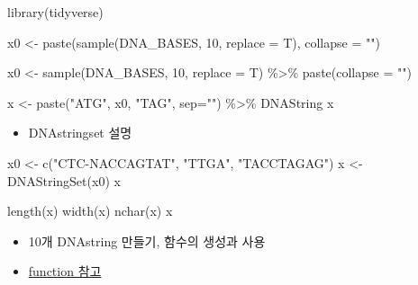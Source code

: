 \documentclass[
]{book}
\newenvironment{Shaded}{\begin{snugshade}}{\end{snugshade}}
\newcommand{\AttributeTok}[1]{\textcolor[rgb]{0.77,0.63,0.00}{#1}}
\newcommand{\DecValTok}[1]{\textcolor[rgb]{0.00,0.00,0.81}{#1}}
\newcommand{\FunctionTok}[1]{\textcolor[rgb]{0.00,0.00,0.00}{#1}}
\newcommand{\NormalTok}[1]{#1}
\newcommand{\OtherTok}[1]{\textcolor[rgb]{0.56,0.35,0.01}{#1}}
\newcommand{\SpecialCharTok}[1]{\textcolor[rgb]{0.00,0.00,0.00}{#1}}
\newcommand{\StringTok}[1]{\textcolor[rgb]{0.31,0.60,0.02}{#1}}
\providecommand{\tightlist}{%
  \setlength{\itemsep}{0pt}\setlength{\parskip}{0pt}}
\begin{document}
\begin{Shaded}
\begin{Highlighting}[]
\FunctionTok{library}\NormalTok{(tidyverse)}

\NormalTok{x0 }\OtherTok{\textless{}{-}} \FunctionTok{paste}\NormalTok{(}\FunctionTok{sample}\NormalTok{(DNA\_BASES, }\DecValTok{10}\NormalTok{, }\AttributeTok{replace =}\NormalTok{ T), }\AttributeTok{collapse =} \StringTok{""}\NormalTok{)}

\NormalTok{x0 }\OtherTok{\textless{}{-}} \FunctionTok{sample}\NormalTok{(DNA\_BASES, }\DecValTok{10}\NormalTok{, }\AttributeTok{replace =}\NormalTok{ T) }\SpecialCharTok{\%\textgreater{}\%}
        \FunctionTok{paste}\NormalTok{(}\AttributeTok{collapse =} \StringTok{""}\NormalTok{)}

\NormalTok{x }\OtherTok{\textless{}{-}} \FunctionTok{paste}\NormalTok{(}\StringTok{"ATG"}\NormalTok{, x0, }\StringTok{"TAG"}\NormalTok{, }\AttributeTok{sep=}\StringTok{""}\NormalTok{) }\SpecialCharTok{\%\textgreater{}\%} 
\NormalTok{      DNAString}
\NormalTok{x}
\end{Highlighting}
\end{Shaded}

\begin{itemize}
\tightlist
\item
  DNAstringset 설명
\end{itemize}

\begin{Shaded}
\begin{Highlighting}[]
\NormalTok{x0 }\OtherTok{\textless{}{-}} \FunctionTok{c}\NormalTok{(}\StringTok{"CTC{-}NACCAGTAT"}\NormalTok{, }\StringTok{"TTGA"}\NormalTok{, }\StringTok{"TACCTAGAG"}\NormalTok{)}
\NormalTok{x }\OtherTok{\textless{}{-}} \FunctionTok{DNAStringSet}\NormalTok{(x0)}
\NormalTok{x}

\FunctionTok{length}\NormalTok{(x)}
\FunctionTok{width}\NormalTok{(x)}
\FunctionTok{nchar}\NormalTok{(x)}
\NormalTok{x}
\end{Highlighting}
\end{Shaded}

\begin{itemize}
\tightlist
\item
  10개 DNAstring 만들기, 함수의 생성과 사용
\item
  \href{https://greendaygh.github.io/kribbr2022/r-programming.html\#functions}{function 참고}
\end{itemize}
\end{document}

